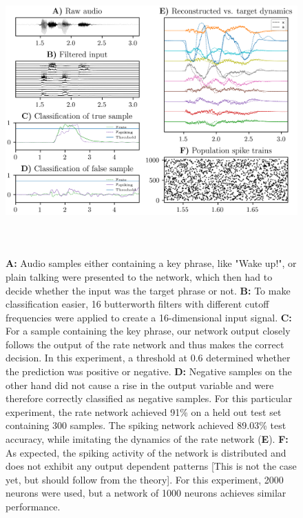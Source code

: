 \documentclass[twoside,11pt,titlepage]{article}
\begin{document}
\begin{figure}[!htb]
  \includegraphics[width = \columnwidth, height=11cm]{figures/figure3.png}
  \caption{\textbf{A:} Audio samples either containing a key phrase, like "Wake up!", or plain talking were
  presented to the network, which then had to decide whether the input was the target phrase or not.
  \textbf{B:} To make classification easier, 16 butterworth filters with different cutoff frequencies
  were applied to create a 16-dimensional input signal. \textbf{C:} For a sample containing the key phrase,
  our network output closely follows the output of the rate network and thus makes the correct decision. In this experiment,
  a threshold at 0.6 determined whether the prediction was positive or negative. \textbf{D:} Negative samples on the other hand
  did not cause a rise in the output variable and were therefore correctly classified as negative samples. For this particular experiment,
  the rate network achieved 91\% on a held out test set containing 300 samples. The spiking network achieved 89.03\% test accuracy,
  while imitating the dynamics of the rate network (\textbf{E}). \textbf{F:} As expected, the spiking activity of the
  network is distributed and does not exhibit any output dependent patterns [This is not the case yet, but should follow from the theory].
  For this experiment, 2000 neurons were used, but a network of 1000 neurons achieves similar performance.}
  \label{fig:figure2}
\end{figure}

\newpage

\vskip 0.2in

\end{document}
